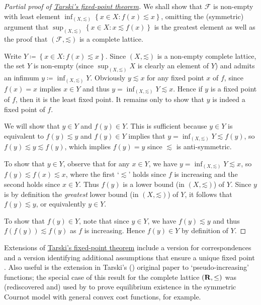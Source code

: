 \begin{proof}[Partial proof of {\hyperref[theorem:tarski]{Tarski's fixed-point theorem}}]
	We shall show that $\mathcal{F}$ is non-empty with least element $\inf_{(X,\mathord{\lesssim})} \left\{ x \in X : f(x) \lesssim x \right\}$, omitting the (symmetric) argument that $\sup_{(X,\mathord{\lesssim})} \left\{ x \in X : x \lesssim f(x) \right\}$ is the greatest element as well as the proof that $(\mathcal{F},\mathord{\lesssim})$ is a complete lattice. 

	Write $Y \coloneqq \left\{ x \in X : f(x) \lesssim x \right\}$. Since $(X,\mathord{\lesssim})$ is a non-empty complete lattice, the set $Y$ is non-empty (since $\sup_{(X,\mathord{\lesssim})} X$ is clearly an element of $Y$) and admits an infimum $y \coloneqq \inf_{(X,\mathord{\lesssim})} Y$.
	Obviously $y \lesssim x$ for any fixed point $x$ of $f$, since $f(x)=x$ implies $x \in Y$ and thus $y = \inf_{(X,\mathord{\lesssim})} Y \lesssim x$.
	Hence if $y$ is a fixed point of $f$, then it is the least fixed point. It remains only to show that $y$ is indeed a fixed point of $f$.

	We will show that $y \in Y$ and $f(y) \in Y$. This is sufficient because $y \in Y$ is equivalent to $f(y) \lesssim y$ and $f(y) \in Y$ implies that $y = \inf_{(X,\mathord{\lesssim})} Y \lesssim f(y)$, so $f(y) \lesssim y \lesssim f(y)$, which implies $f(y)=y$ since $\lesssim$ is anti-symmetric.

	To show that $y \in Y$, observe that for any $x \in Y$, we have $y = \inf_{(X,\mathord{\lesssim})} Y \lesssim x$, so $f(y) \lesssim f(x) \lesssim x$, where the first `$\lesssim$' holds since $f$ is increasing and the second holds since $x \in Y$. Thus $f(y)$ is a lower bound (in $(X,\mathord{\lesssim})$) of $Y$. Since $y$ is by definition the \emph{greatest} lower bound (in $(X,\mathord{\lesssim})$) of $Y$, it follows that $f(y) \lesssim y$, or equivalently $y \in Y$.

	To show that $f(y) \in Y$, note that since $y \in Y$, we have $f(y) \lesssim y$ and thus $f(f(y)) \lesssim f(y)$ as $f$ is increasing. Hence $f(y) \in Y$ by definition of $Y$.
\end{proof}

\begin{remark}
	\label{remark:tarski_extension}
	Extensions of \hyperref[theorem:tarski]{Tarski's fixed-point theorem} include a version for correspondences \parencite{Zhou1994} and a version identifying additional assumptions that ensure a unique fixed point \parencite{MarinacciMontruccio2019}. Also useful is the extension in Tarski's (\citeyear{Tarski1955}) original paper to `pseudo-increasing' functions; the special case of this result for the complete lattice $(\mathbf{R},\mathord{\leq})$ was (rediscovered and) used by \textcite{RobertsSonnenschein1976} to prove equilibrium existence in the symmetric Cournot model with general convex cost functions, for example.
\end{remark}



